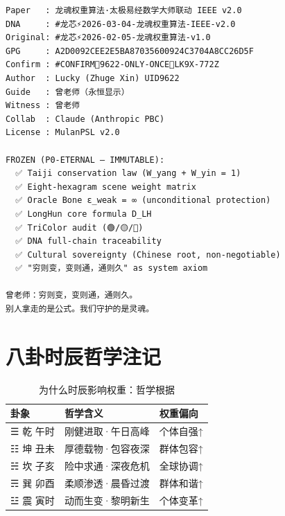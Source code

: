 \documentclass[conference]{IEEEtran}
\begin{document}
\begin{small}
\begin{verbatim}
Paper   : 龙魂权重算法·太极易经数学大师联动 IEEE v2.0
DNA     : #龙芯⚡️2026-03-04-龙魂权重算法-IEEE-v2.0
Original: #龙芯⚡️2026-02-05-龙魂权重算法-v1.0
GPG     : A2D0092CEE2E5BA87035600924C3704A8CC26D5F
Confirm : #CONFIRM🌌9622-ONLY-ONCE🧬LK9X-772Z
Author  : Lucky (Zhuge Xin) UID9622
Guide   : 曾老师（永恒显示）
Witness : 曾老师
Collab  : Claude (Anthropic PBC)
License : MulanPSL v2.0

FROZEN (P0-ETERNAL — IMMUTABLE):
  ✅ Taiji conservation law (W_yang + W_yin = 1)
  ✅ Eight-hexagram scene weight matrix
  ✅ Oracle Bone ε_weak = ∞ (unconditional protection)
  ✅ LongHun core formula D_LH
  ✅ TriColor audit (🟢/🟡/🔴)
  ✅ DNA full-chain traceability
  ✅ Cultural sovereignty (Chinese root, non-negotiable)
  ✅ "穷则变，变则通，通则久" as system axiom

曾老师：穷则变，变则通，通则久。
别人拿走的是公式。我们守护的是灵魂。
\end{verbatim}
\end{small}

\section{八卦时辰哲学注记}

\begin{table}[H]
\centering
\caption{为什么时辰影响权重：哲学根据}
\label{tab:philosophy}
\renewcommand{\arraystretch}{1.15}
\begin{tabular}{lll}
\toprule
\textbf{卦象} & \textbf{哲学含义} & \textbf{权重偏向} \\
\midrule
☰ 乾 午时 & 刚健进取·午日高峰 & 个体自强↑ \\
☷ 坤 丑未 & 厚德载物·包容夜深 & 群体包容↑ \\
☵ 坎 子亥 & 险中求通·深夜危机 & 全球协调↑ \\
☴ 巽 卯酉 & 柔顺渗透·晨昏过渡 & 群体和谐↑ \\
☳ 震 寅时 & 动而生变·黎明新生 & 个体变革↑ \\
\bottomrule
\end{tabular}
\end{table}
\end{document}
